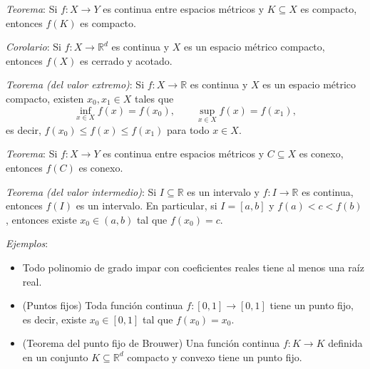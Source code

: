 \documentclass{beamer}
\begin{document}
  \begin{frame}
    \textit{Teorema}: Si $f: X \to Y$ es continua entre espacios métricos y 
    $K \subseteq X$ es compacto, entonces $f(K)$ es compacto.
    \newline\newline
    \pause

    \textit{Corolario}: Si $f: X \to \mathbb{R}^d$ es continua y $X$ es un espacio 
    métrico compacto, entonces $f(X)$ es cerrado y acotado.
    \newline\newline
    \pause

    \textit{Teorema (del valor extremo)}: Si $f: X \to \mathbb{R}$ es continua y $X$ es 
    un espacio métrico compacto, existen $x_0, x_1 \in X$ tales que
    \[
      \inf_{x \in X} f(x) = f(x_0), \qquad \sup_{x \in X} f(x) = f(x_1),
    \]
    es decir, $f(x_0) \leq f(x) \leq f(x_1)$ para todo $x \in X$.
  \end{frame}

  \begin{frame}
    \textit{Teorema}: Si $f: X \to Y$ es continua entre espacios métricos y 
    $C \subseteq X$ es conexo, entonces $f(C)$ es conexo.
    \newline\newline
    \pause

    \textit{Teorema (del valor intermedio)}: Si $I \subseteq \mathbb{R}$ es un intervalo 
    y $f: I \to \mathbb{R}$ es continua, entonces $f(I)$ es un intervalo. En particular, 
    si $I = [a, b]$ y $f(a) < c < f(b)$, entonces existe $x_0 \in (a, b)$ tal que 
    $f(x_0) = c$.
  \end{frame}

  \begin{frame}
    \textit{Ejemplos}:
    \begin{itemize}[<+->]
      \item Todo polinomio de grado impar con coeficientes reales tiene al menos una 
      raíz real.
      \item (Puntos fijos) Toda función continua $f: [0, 1] \to [0, 1]$ tiene un punto 
      fijo, es decir, existe $x_0 \in [0, 1]$ tal que $f(x_0) = x_0$.
      \item (Teorema del punto fijo de Brouwer) Una función continua $f: K \to K$ definida 
      en un conjunto $K \subseteq \mathbb{R}^d$ compacto y convexo tiene un punto fijo.
    \end{itemize}
  \end{frame}
\end{document}
